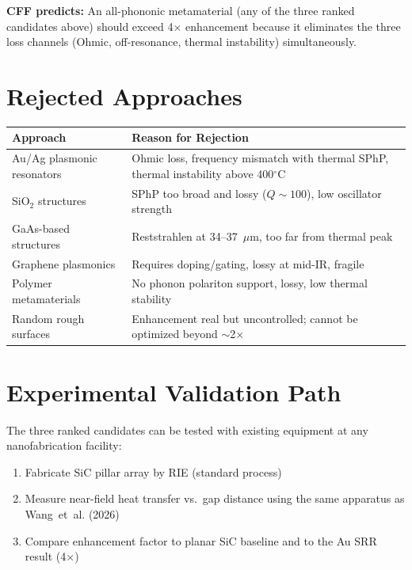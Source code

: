 \documentclass[11pt, a4paper]{article}
\begin{document}
\textbf{CFF predicts:} An all-phononic metamaterial (any of
the three ranked candidates above) should exceed 4$\times$
enhancement because it eliminates the three loss channels
(Ohmic, off-resonance, thermal instability) simultaneously.

\section{Rejected Approaches}

\begin{center}
\begin{tabular}{@{}lp{7cm}@{}}
\toprule
\textbf{Approach} & \textbf{Reason for Rejection} \\
\midrule
Au/Ag plasmonic resonators & Ohmic loss, frequency mismatch
  with thermal SPhP, thermal instability above 400$^\circ$C \\
SiO$_2$ structures & SPhP too broad and lossy ($Q \sim 100$),
  low oscillator strength \\
GaAs-based structures & Reststrahlen at 34--37~$\mu$m, too
  far from thermal peak \\
Graphene plasmonics & Requires doping/gating, lossy at
  mid-IR, fragile \\
Polymer metamaterials & No phonon polariton support, lossy,
  low thermal stability \\
Random rough surfaces & Enhancement real but uncontrolled;
  cannot be optimized beyond $\sim$2$\times$ \\
\bottomrule
\end{tabular}
\end{center}

\section{Experimental Validation Path}

The three ranked candidates can be tested with existing
equipment at any nanofabrication facility:

\begin{enumerate}[nosep]
  \item Fabricate SiC pillar array by RIE (standard process)
  \item Measure near-field heat transfer vs.\ gap distance
        using the same apparatus as Wang~et~al. (2026)
  \item Compare enhancement factor to planar SiC baseline
        and to the Au SRR result (4$\times$)
\end{enumerate}
\end{document}
